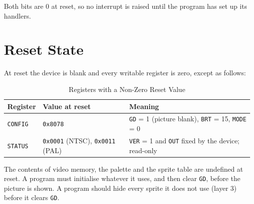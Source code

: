 Both bits are 0 at reset, so no interrupt is raised until the program has set up its handlers.

\section{Reset State}
\label{sec:reset}

At reset the device is blank and every writable register is zero, except as follows:

\begin{table}[H]
	\centering
	\begin{tabular}{lll}
		\toprule
		\textbf{Register} & \textbf{Value at reset}                       & \textbf{Meaning}                                                      \\
		\midrule
		\texttt{CONFIG}   & \texttt{0x8078}                               & \texttt{GD} = 1 (picture blank), \texttt{BRT} = 15, \texttt{MODE} = 0 \\
		\texttt{STATUS}   & \texttt{0x0001} (NTSC), \texttt{0x0011} (PAL) & \texttt{VER} = 1 and \texttt{OUT} fixed by the device; read-only      \\
		\bottomrule
	\end{tabular}
	\caption{Registers with a Non-Zero Reset Value}
	\label{tab:reset}
\end{table}

The contents of video memory, the palette and the sprite table are undefined at reset. A program must initialise
whatever it uses, and then clear \texttt{GD}, before the picture is shown. A program should hide every sprite it does
not use (layer 3) before it clears \texttt{GD}.

